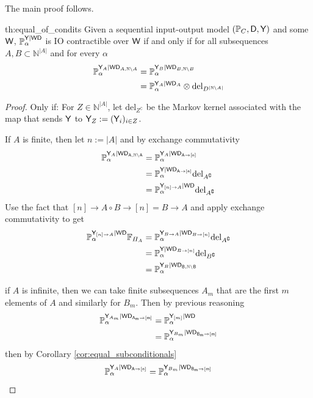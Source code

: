 The main proof follows.

\begin{reptheorem}{th:equal_of_condits}
Given a sequential input-output model $(\mathbb{P}_C,\mathsf{D},\mathsf{Y})$ and some $\mathsf{W}$, $\mathbb{P}_\alpha^{\mathsf{Y}|\mathsf{WD}}$ is IO contractible over $\mathsf{W}$ if and only if for all subsequences $A,B\subset \mathbb{N}^{|A|}$ and for every $\alpha$
\begin{align}
    \mathbb{P}_\alpha^{\mathsf{Y}_A|\mathsf{WD}_{A,\mathbb{N}\setminus A}} &= \mathbb{P}_\alpha^{\mathsf{Y}_B|\mathsf{WD}_{B,\mathbb{N}\setminus B}}\\
    &= \mathbb{P}_\alpha^{\mathsf{Y}_A|\mathsf{WD}_A}\otimes \text{del}_{D^{|\mathbb{N}\setminus A|}}
\end{align}
\end{reptheorem}

\begin{proof}
Only if:
For $Z\in \mathbb{N}^{|A|}$, let $\text{del}_{Z^\complement}$ be the Markov kernel associated with the map that sends $\mathsf{Y}$ to $\mathsf{Y}_Z:=(\mathsf{Y}_i)_{i\in Z}$.

If $A$ is finite, then let $n:=|A|$ and by exchange commutativity
\begin{align}
        \mathbb{P}_\alpha^{\mathsf{Y}_A|\mathsf{WD_{A,\mathbb{N}\setminus A}}}&= \mathbb{P}_\alpha^{\mathsf{Y}_A|\mathsf{WD_{A\rightarrow [n]}}}\\
         &= \mathbb{P}_\alpha^{\mathsf{Y}|\mathsf{WD_{A\rightarrow [n]}}}\text{del}_{A^{\complement}}\\
        &=  \mathbb{P}_\alpha^{\mathsf{Y}_{[n]\rightarrow A}|\mathsf{WD}}\text{del}_{A^{\complement}}
\end{align}
Use the fact that $[n]\rightarrow A \circ B\rightarrow [n]= B\rightarrow A$ and apply exchange commutativity to get
\begin{align}
	\mathbb{P}_\alpha^{\mathsf{Y}_{[n]\rightarrow A}|\mathsf{WD}}\mathbb{F}_{\Pi_{A}} &= \mathbb{P}_\alpha^{\mathsf{Y}_{B\rightarrow A}|\mathsf{WD}_{B\rightarrow [n]}}\text{del}_{A^{\complement}}\\
	&= \mathbb{P}_\alpha^{\mathsf{Y}|\mathsf{WD}_{B\rightarrow [n]}}\text{del}_{B^{\complement}}\\
	&= \mathbb{P}_\alpha^{\mathsf{Y}_B|\mathsf{WD_{B,\mathbb{N}\setminus B}}}
\end{align}

if $A$ is infinite, then we can take finite subsequences $A_m$ that are the first $m$ elements of $A$ and similarly for $B_m$. Then by previous reasoning
\begin{align}
            \mathbb{P}_\alpha^{\mathsf{Y}_{A_m}|\mathsf{WD_{A_m\rightarrow [m]}}} &= \mathbb{P}_\alpha^{\mathsf{Y}_{[m]}|\mathsf{WD}}\\
        &= \mathbb{P}_\alpha^{\mathsf{Y}_{B_m}|\mathsf{WD_{B_m\rightarrow [m]}}}
\end{align}
then by Corollary \ref{cor:equal_subconditionals}
\begin{align}
\mathbb{P}_\alpha^{\mathsf{Y}_A|\mathsf{WD_{A\rightarrow [n]}}}=\mathbb{P}_\alpha^{\mathsf{Y}_{B_m}|\mathsf{WD_{B_m\rightarrow [m]}}}
\end{align}


\end{proof}
